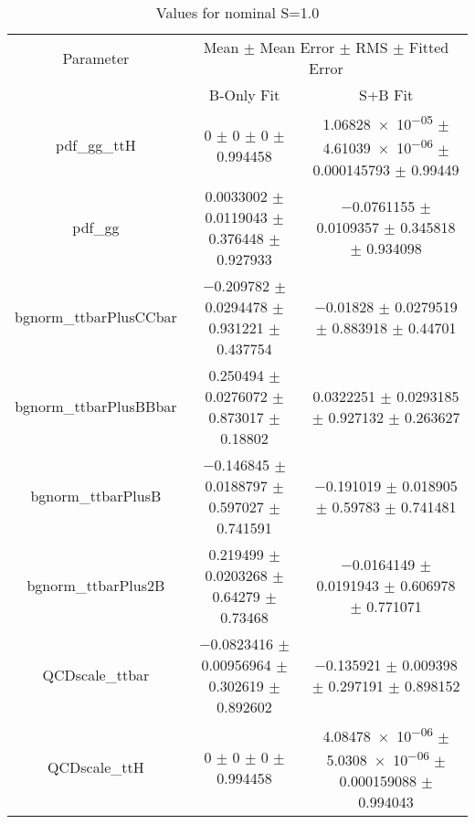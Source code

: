 \begin{table}
\centering
\caption{Values for nominal S=1.0}
\begin{tabular}{ccc}
\toprule
Parameter & \multicolumn{2}{c}{Mean $\pm$ Mean Error $\pm$ RMS $\pm$ Fitted Error}\\
 & B-Only Fit & S+B Fit\\
\midrule
pdf\_gg\_ttH & \num{0} $\pm$ \num{0} $\pm$ \num{0} $\pm$ \num{0.994458} & \num{1.06828e-05} $\pm$ \num{4.61039e-06} $\pm$ \num{0.000145793} $\pm$ \num{0.99449}\\
pdf\_gg & \num{0.0033002} $\pm$ \num{0.0119043} $\pm$ \num{0.376448} $\pm$ \num{0.927933} & \num{-0.0761155} $\pm$ \num{0.0109357} $\pm$ \num{0.345818} $\pm$ \num{0.934098}\\
bgnorm\_ttbarPlusCCbar & \num{-0.209782} $\pm$ \num{0.0294478} $\pm$ \num{0.931221} $\pm$ \num{0.437754} & \num{-0.01828} $\pm$ \num{0.0279519} $\pm$ \num{0.883918} $\pm$ \num{0.44701}\\
bgnorm\_ttbarPlusBBbar & \num{0.250494} $\pm$ \num{0.0276072} $\pm$ \num{0.873017} $\pm$ \num{0.18802} & \num{0.0322251} $\pm$ \num{0.0293185} $\pm$ \num{0.927132} $\pm$ \num{0.263627}\\
bgnorm\_ttbarPlusB & \num{-0.146845} $\pm$ \num{0.0188797} $\pm$ \num{0.597027} $\pm$ \num{0.741591} & \num{-0.191019} $\pm$ \num{0.018905} $\pm$ \num{0.59783} $\pm$ \num{0.741481}\\
bgnorm\_ttbarPlus2B & \num{0.219499} $\pm$ \num{0.0203268} $\pm$ \num{0.64279} $\pm$ \num{0.73468} & \num{-0.0164149} $\pm$ \num{0.0191943} $\pm$ \num{0.606978} $\pm$ \num{0.771071}\\
QCDscale\_ttbar & \num{-0.0823416} $\pm$ \num{0.00956964} $\pm$ \num{0.302619} $\pm$ \num{0.892602} & \num{-0.135921} $\pm$ \num{0.009398} $\pm$ \num{0.297191} $\pm$ \num{0.898152}\\
QCDscale\_ttH & \num{0} $\pm$ \num{0} $\pm$ \num{0} $\pm$ \num{0.994458} & \num{4.08478e-06} $\pm$ \num{5.0308e-06} $\pm$ \num{0.000159088} $\pm$ \num{0.994043}\\
\bottomrule
\end{tabular}
\end{table}